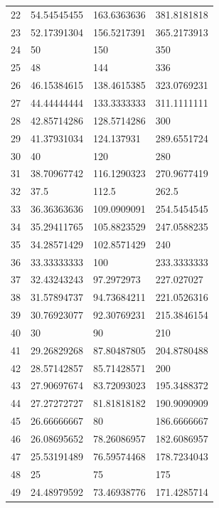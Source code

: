 \documentclass[a4paper]{tufte-handout}
\begin{document}
\begin{table}[!h]
\begin{tabular}{llll}
            22 & 54.54545455 & 163.6363636 & 381.8181818 \\
            23 & 52.17391304 & 156.5217391 & 365.2173913 \\
            24 & 50 & 150 & 350 \\
            25 & 48 & 144 & 336 \\
            26 & 46.15384615 & 138.4615385 & 323.0769231 \\
            27 & 44.44444444 & 133.3333333 & 311.1111111 \\
            28 & 42.85714286 & 128.5714286 & 300 \\
            29 & 41.37931034 & 124.137931 & 289.6551724 \\
            30 & 40 & 120 & 280 \\
            31 & 38.70967742 & 116.1290323 & 270.9677419 \\
            32 & 37.5 & 112.5 & 262.5 \\
            33 & 36.36363636 & 109.0909091 & 254.5454545 \\
            34 & 35.29411765 & 105.8823529 & 247.0588235 \\
            35 & 34.28571429 & 102.8571429 & 240 \\
            36 & 33.33333333 & 100 & 233.3333333 \\
            37 & 32.43243243 & 97.2972973 & 227.027027 \\
            38 & 31.57894737 & 94.73684211 & 221.0526316 \\
            39 & 30.76923077 & 92.30769231 & 215.3846154 \\
            40 & 30 & 90 & 210 \\
            41 & 29.26829268 & 87.80487805 & 204.8780488 \\
            42 & 28.57142857 & 85.71428571 & 200 \\
            43 & 27.90697674 & 83.72093023 & 195.3488372 \\
            44 & 27.27272727 & 81.81818182 & 190.9090909 \\
            45 & 26.66666667 & 80 & 186.6666667 \\
            46 & 26.08695652 & 78.26086957 & 182.6086957 \\
            47 & 25.53191489 & 76.59574468 & 178.7234043 \\
            48 & 25 & 75 & 175 \\
            49 & 24.48979592 & 73.46938776 & 171.4285714 \\

\end{tabular}
\end{table}
\end{document}
